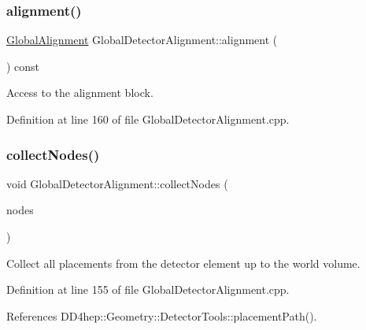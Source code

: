 \subsubsection{\texorpdfstring{alignment()}{alignment()}}
{\footnotesize\ttfamily \hyperlink{class_d_d4hep_1_1_alignments_1_1_global_alignment}{Global\+Alignment} Global\+Detector\+Alignment\+::alignment (\begin{DoxyParamCaption}{ }\end{DoxyParamCaption}) const}



Access to the alignment block. 



Definition at line 160 of file Global\+Detector\+Alignment.\+cpp.

\hypertarget{class_d_d4hep_1_1_alignments_1_1_global_detector_alignment_ac3bae1db0cf6bd1d5df4514d343cb352}{}\label{class_d_d4hep_1_1_alignments_1_1_global_detector_alignment_ac3bae1db0cf6bd1d5df4514d343cb352} 
\subsubsection{\texorpdfstring{collect\+Nodes()}{collectNodes()}}
{\footnotesize\ttfamily void Global\+Detector\+Alignment\+::collect\+Nodes (\begin{DoxyParamCaption}\item[{std\+::vector$<$ \hyperlink{class_d_d4hep_1_1_geometry_1_1_placed_volume}{Placed\+Volume} $>$ \&}]{nodes }\end{DoxyParamCaption})}



Collect all placements from the detector element up to the world volume. 



Definition at line 155 of file Global\+Detector\+Alignment.\+cpp.



References D\+D4hep\+::\+Geometry\+::\+Detector\+Tools\+::placement\+Path().

\hypertarget{class_d_d4hep_1_1_alignments_1_1_global_detector_alignment_aeb175ec1d0dede0976111a2887c17fd6}{}\label{class_d_d4hep_1_1_alignments_1_1_global_detector_alignment_aeb175ec1d0dede0976111a2887c17fd6} 
